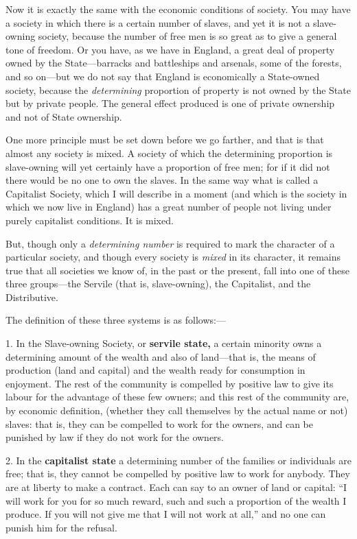 \documentclass{book}
\begin{document}
Now it is exactly the same with the economic conditions of society. You may have a society in which there is a certain number of slaves, and yet it is not a slave-owning society, because the number of free men is so great as to give a general tone of freedom. Or you have, as we have in England, a great deal of property owned by the State—barracks and battleships and arsenals, some of the forests, and so on—but we do not say that England is economically a State-owned society, because the \emph{determining} proportion of property is not owned by the State but by private people. The general effect produced is one of private ownership and not of State ownership.

One more principle must be set down before we go farther, and that is that almost any society is mixed. A society of which the determining proportion is slave-owning will yet certainly have a proportion of free men; for if it did not there would be no one to own the slaves. In the same way what is called a Capitalist Society, which I will describe in a moment (and which is the society in which we now live in England) has a great number of people not living under purely capitalist conditions. It is mixed.

But, though only a \emph{determining number} is required to mark the character of a particular society, and though every society is \emph{mixed} in its character, it remains true that all societies we know of, in the past or the present, fall into one of these three groups—the Servile (that is, slave-owning), the Capitalist, and the Distributive.

The definition of these three systems is as follows:—

1. In the Slave-owning Society, or \textbf{servile state,} a certain minority owns a determining amount of the wealth and also of land—that is, the means of production (land and capital) and the wealth ready for consumption in enjoyment. The rest of the community is compelled by positive law to give its labour for the advantage of these few owners; and this rest of the community are, by economic definition, (whether they call themselves by the actual name or not) slaves: that is, they can be compelled to work for the owners, and can be punished by law if they do not work for the owners.

2. In the \textbf{capitalist state} a determining number of the families or individuals are free; that is, they cannot be compelled by positive law to work for anybody. They are at liberty to make a contract. Each can say to an owner of land or capital: “I will work for you for so much reward, such and such a proportion of the wealth I produce. If you will not give me that I will not work at all,” and no one can punish him for the refusal.
\end{document}
